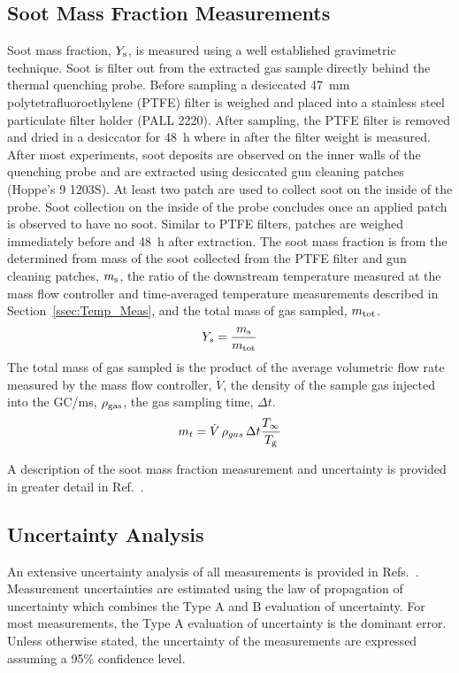 \documentclass[12pt]{ussci}
\begin{document}
\subsection{Soot Mass Fraction Measurements}
Soot mass fraction, $Y_{\rm s}$, is measured using a well established gravimetric technique. Soot is filter out from the extracted gas sample directly behind the thermal quenching probe. Before sampling a desiccated 47~mm polytetrafluoroethylene (PTFE) filter is weighed and placed into a stainless steel particulate filter holder (PALL 2220). After sampling, the PTFE filter is removed and dried in a desiccator for 48~h where in after the filter weight is measured. 
After most experiments, soot deposits are observed on the inner walls of the quenching probe and are extracted using desiccated gun cleaning patches (Hoppe's 9 1203S). At least two patch are used to collect soot on the inside of the probe. Soot collection on the inside of the probe concludes once an applied patch is observed to have no soot. Similar to PTFE filters, patches are weighed immediately before and 48~h after extraction. 
The soot mass fraction is  from the determined from mass of the soot collected from the PTFE filter and gun cleaning patches, $m_{\rm s}$, the ratio of the downstream temperature measured at the mass flow controller and time-averaged temperature measurements described in Section~\ref{ssec:Temp_Meas}, and the total mass of gas sampled, $m_{\rm tot}$.
\begin{equation}\label{eq:soot_mass_frac}
Y_{s}= \frac{m_{\rm s}}{m_{\rm tot}}
\end{equation}
The total mass of gas sampled is the product of the average volumetric flow rate measured by the mass flow controller, $\dot{V}$, the density of the sample gas injected into the GC/ms, $\rho_{\rm gas}$, the gas sampling time, $\Delta t$. 
\begin{equation}\label{eq:total_mass}
m_{t}= \dot{V} \, \rho_{gas}\, \Delta t \frac{T_{\infty}}{T_{\rm g}}
\end{equation}

A description of the soot mass fraction measurement and uncertainty is provided in greater detail in Ref.~\cite{}. 

\subsection{Uncertainty Analysis}
An extensive uncertainty analysis of all measurements is provided in Refs.~\cite{}. Measurement uncertainties are estimated using the law of propagation of uncertainty which combines the Type A and B evaluation of uncertainty. For most measurements, the Type A evaluation of uncertainty is the dominant error. Unless otherwise stated, the uncertainty of the measurements are expressed assuming a 95\% confidence level. 
\end{document}
